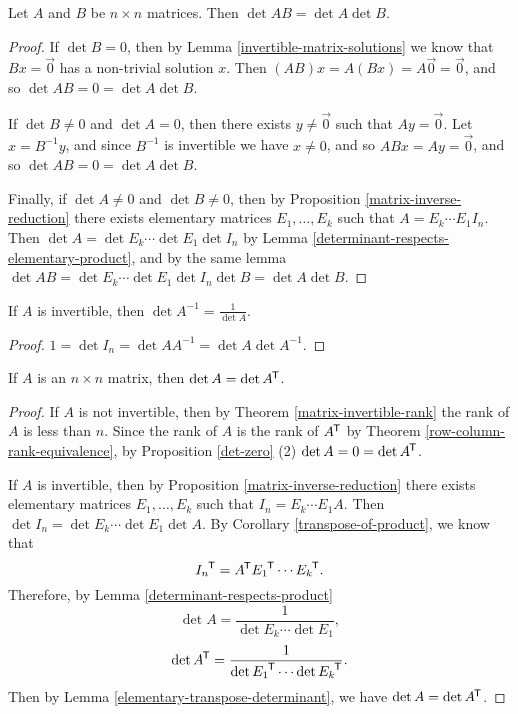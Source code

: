 \begin{thm}\label{determinant-respects-product}
    Let $A$ and $B$ be $n \times n$ matrices. Then $\det AB = \det A \det B$.
\end{thm}

\begin{proof}
    If $\det B = 0$, then by Lemma \ref{invertible-matrix-solutions} we know that $Bx = \vec{0}$ has a non-trivial solution $x$. Then $(AB)x = A(Bx) = A\vec{0} = \vec{0}$, and so $\det AB = 0 = \det A\det B$.

    If $\det B \neq 0$ and $\det A = 0$, then there exists $y \neq \vec{0}$ such that $Ay = \vec{0}$. Let $x = B^{-1}y$, and since $B^{-1}$ is invertible we have $x \neq 0$, and so $ABx = Ay = \vec{0}$, and so $\det AB = 0 = \det A\det B$.

    Finally, if $\det A \neq 0$ and $\det B \neq 0$, then by Proposition \ref{matrix-inverse-reduction} there exists elementary matrices $E_1, \ldots, E_{k}$ such that $A = E_{k}\cdots E_1I_n$. Then $\det A = \det E_{k}\cdots \det E_1\det I_n$ by Lemma \ref{determinant-respects-elementary-product}, and by the same lemma $\det AB = \det E_{k}\cdots \det E_1\det I_n\det B = \det A\det B$.
\end{proof}

\begin{cor}
    If $A$ is invertible, then $\det A^{-1} = \frac{1}{\det A}$.
\end{cor}

\begin{proof}
    $1 = \det I_n = \det AA^{-1} = \det A\det A^{-1}$.
\end{proof}

\begin{thm}
    If $A$ is an $n \times n$ matrix, then $\det A = \det{A}^{\mkern-1.5mu\mathsf{T}}$.
\end{thm}

\begin{proof}
    If $A$ is not invertible, then by Theorem \ref{matrix-invertible-rank} the rank of $A$ is less than $n$. Since the rank of $A$ is the rank of ${A}^{\mkern-1.5mu\mathsf{T}}$ by Theorem \ref{row-column-rank-equivalence}, by Proposition \ref{det-zero} (2) $\det A = 0 = \det{A}^{\mkern-1.5mu\mathsf{T}}$.

    If $A$ is invertible, then by Proposition \ref{matrix-inverse-reduction} there exists elementary matrices $E_1, \ldots, E_{k}$ such that $I_n = E_{k}\cdots E_1A$. Then $\det I_n = \det E_{k}\cdots \det E_1 \det A$. By Corollary \ref{transpose-of-product}, we know that
    \[{I_n}^{\mkern-1.5mu\mathsf{T}} = {A}^{\mkern-1.5mu\mathsf{T}}{E_1}^{\mkern-1.5mu\mathsf{T}}\cdots {E_k}^{\mkern-1.5mu\mathsf{T}}.\]
    Therefore, by Lemma \ref{determinant-respects-product}
    \[\det A = \frac{1}{\det E_k\cdots \det E_1},\]
    \[\det{A}^{\mkern-1.5mu\mathsf{T}} = \frac{1}{\det{E_1}^{\mkern-1.5mu\mathsf{T}}\cdots \det{E_k}^{\mkern-1.5mu\mathsf{T}}}.\]
    Then by Lemma \ref{elementary-transpose-determinant}, we have $\det A = \det{A}^{\mkern-1.5mu\mathsf{T}}$.
\end{proof}

